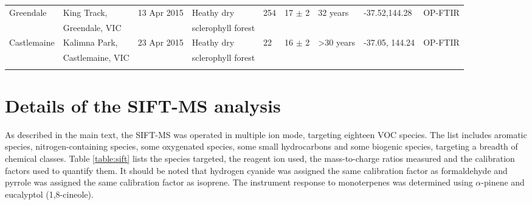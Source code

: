 \documentclass[acp, manuscript]{copernicus}
\begin{document}
\begin{sidewaystable}
\begin{tabular}{l l l l  l l l l l }
 Greendale&King Track, &13 Apr 2015&Heathy dry &254&17 $\pm$ 2&32 years&-37.52,144.28&OP-FTIR\\ 
 &Greendale, VIC&&sclerophyll forest&&&&&\\
 Castlemaine&Kalimna Park, &23 Apr 2015&Heathy dry&22&16 $\pm$ 2&>30 years&-37.05, 144.24&OP-FTIR\\
 &Castlemaine, VIC&&sclerophyll forest&&&&&\\
    \bottomhline
  \end{tabular}
  \label{table:fires}
\end{sidewaystable}

\section{Details of the SIFT-MS analysis}
As described in the main text, the SIFT-MS was operated in multiple ion mode, targeting eighteen VOC species. The list includes aromatic species, nitrogen-containing species, some oxygenated species, some small hydrocarbons and some biogenic species, targeting a breadth of chemical classes. Table \ref{table:sift} lists the species targeted, the reagent ion used, the mass-to-charge ratios measured and the calibration factors used to quantify them. 
It should be noted that hydrogen cyanide was assigned the same calibration factor as formaldehyde and pyrrole was assigned the same calibration factor as isoprene. The instrument response to monoterpenes was determined using $\alpha$-pinene and eucalyptol (1,8-cineole). 
\end{document}
